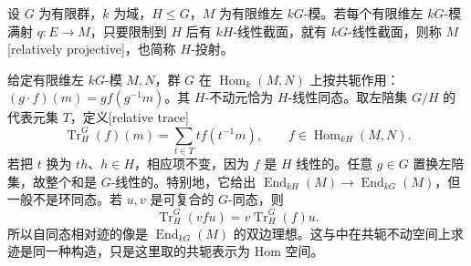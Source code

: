 \begin{definition}\label{b5:def:relative-projectivity}
	设 \(G\) 为有限群，\(k\) 为域，\(H\le G\)，\(M\) 为有限维左 \(kG\)-模。若每个有限维左 \(kG\)-模满射 \(q:E\to M\)，只要限制到 \(H\) 后有 \(kH\)-线性截面，就有 \(kG\)-线性截面，则称 \(M\) [relatively projective]，也简称 \(H\)-投射。
\end{definition}

给定有限维左 \(kG\)-模 \(M,N\)，群 \(G\) 在 \(\operatorname{Hom}_k(M,N)\) 上按共轭作用：\((g\cdot f)(m)=g f(g^{-1}m)\)。其 \(H\)-不动元恰为 \(H\)-线性同态。取左陪集 \(G/H\) 的代表元集 \(T\)，定义[relative trace]
\begin{equation}\label{b5:eq:relative-hom-trace}
	\operatorname{Tr}_H^G(f)(m)=\sum_{t\in T}t f(t^{-1}m),
	\qquad f\in\operatorname{Hom}_{kH}(M,N).
\end{equation}
若把 \(t\) 换为 \(th\)、\(h\in H\)，相应项不变，因为 \(f\) 是 \(H\) 线性的。任意 \(g\in G\) 置换左陪集，故整个和是 \(G\)-线性的。特别地，它给出 \(\operatorname{End}_{kH}(M)\to\operatorname{End}_{kG}(M)\)，但一般不是环同态。若 \(u,v\) 是可复合的 \(G\)-同态，则
\[
	\operatorname{Tr}_H^G(vfu)=v\operatorname{Tr}_H^G(f)u.
\]
所以自同态相对迹的像是 \(\operatorname{End}_{kG}(M)\) 的双边理想。这与中在共轭不动空间上求迹是同一种构造，只是这里取的共轭表示为 Hom 空间。

